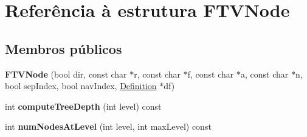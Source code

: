 \hypertarget{struct_f_t_v_node}{\section{Referência à estrutura F\-T\-V\-Node}
\label{struct_f_t_v_node}
}
\subsection*{Membros públicos}
\begin{DoxyCompactItemize}
\item 
\hypertarget{struct_f_t_v_node_a0eeb62cac812cf49bd71aac68f857b44}{{\bfseries F\-T\-V\-Node} (bool dir, const char $\ast$r, const char $\ast$f, const char $\ast$a, const char $\ast$n, bool sep\-Index, bool nav\-Index, \hyperlink{class_definition}{Definition} $\ast$df)}\label{struct_f_t_v_node_a0eeb62cac812cf49bd71aac68f857b44}

\item 
\hypertarget{struct_f_t_v_node_a8cd405814f754bedd55f19a67e989434}{int {\bfseries compute\-Tree\-Depth} (int level) const }\label{struct_f_t_v_node_a8cd405814f754bedd55f19a67e989434}

\item 
\hypertarget{struct_f_t_v_node_ab96e1726dd475826dfe84a038129babf}{int {\bfseries num\-Nodes\-At\-Level} (int level, int max\-Level) const }\label{struct_f_t_v_node_ab96e1726dd475826dfe84a038129babf}

\end{DoxyCompactItemize}
